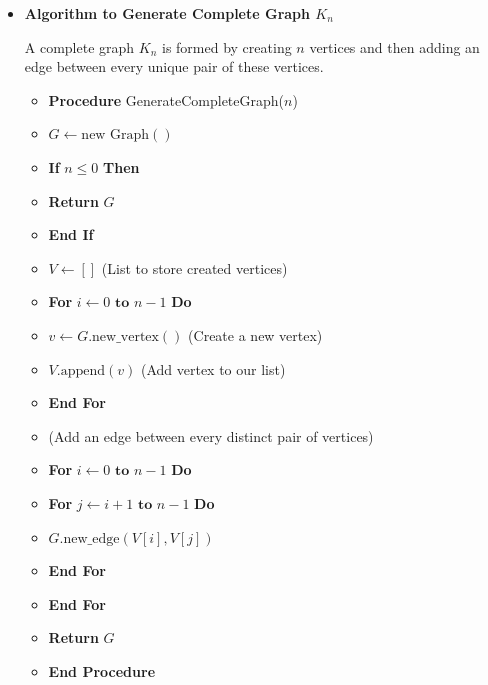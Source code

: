 \documentclass{article}
\begin{document}
\begin{itemize}
    \item \textbf{Algorithm to Generate Complete Graph $K_n$}
    
    A complete graph $K_n$ is formed by creating $n$ vertices and then adding an edge between every unique pair of these vertices.
    
    \begin{itemize}
        \item \textbf{Procedure} GenerateCompleteGraph($n$)
        \item \hspace{0.5cm} $G \gets \text{new Graph}()$
        \item \hspace{0.5cm} \textbf{If} $n \le 0$ \textbf{Then}
        \item \hspace{1cm} \textbf{Return} $G$
        \item \hspace{0.5cm} \textbf{End If}
        \item \hspace{0.5cm} $V \gets []$ (List to store created vertices)
        \item \hspace{0.5cm} \textbf{For} $i \gets 0 \textbf{ to } n-1$ \textbf{Do}
        \item \hspace{1cm} $v \gets G.\text{new\_vertex}()$ (Create a new vertex)
        \item \hspace{1cm} $V.\text{append}(v)$ (Add vertex to our list)
        \item \hspace{0.5cm} \textbf{End For}
        \item \hspace{0.5cm} (Add an edge between every distinct pair of vertices)
        \item \hspace{0.5cm} \textbf{For} $i \gets 0 \textbf{ to } n-1$ \textbf{Do}
        \item \hspace{1cm} \textbf{For} $j \gets i+1 \textbf{ to } n-1$ \textbf{Do}
        \item \hspace{1.5cm} $G.\text{new\_edge}(V[i], V[j])$
        \item \hspace{1cm} \textbf{End For}
        \item \hspace{0.5cm} \textbf{End For}
        \item \hspace{0.5cm} \textbf{Return} $G$
        \item \textbf{End Procedure}
    \end{itemize}


\end{itemize}
\end{document}
